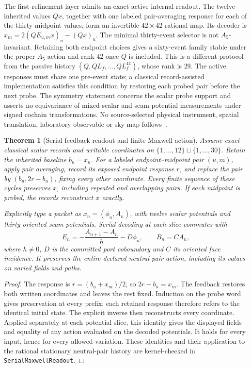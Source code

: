 \documentclass[11pt]{article}
\newtheorem{theorem}{Theorem}[section]
\begin{document}
The first refinement layer admits an exact active internal readout. The
twelve inherited values \(Qx\), together with one labeled pair-averaging
response for each of the thirty midpoint values, form an invertible
\(42\times42\) rational map. Its decoder is
\(x_m=2(Q E_{u,m}x)_u-(Qx)_u\). The minimal thirty-event selector is not
\(A_5\)-invariant. Retaining both endpoint choices gives a sixty-event family
stable under the proper \(A_5\) action and rank \(42\) once \(Q\) is
included. This is a different protocol from the passive history
\((Q,QL_f,\ldots,QL_f^{41})\), whose rank is \(29\). The active responses
must share one pre-event state; a classical record-assisted implementation
satisfies this condition by restoring each probed pair before the next probe.
The symmetry statement concerns the scalar probe support and asserts no
equivariance of mixed scalar and seam-potential measurements under signed
cochain transformations. No source-selected physical instrument, spatial
translation, laboratory observable or sky map follows~\cite{ophfpe}.

\begin{theorem}[Serial feedback readout and finite Maxwell action]
\label{thm:serial-maxwell-readout}
Assume exact classical scalar records and writable coordinates on
\(\{1,\ldots,12\}\sqcup\{1,\ldots,30\}\). Retain the inherited baseline
\(b_u=x_u\). For a labeled endpoint--midpoint pair \((u,m)\), apply pair
averaging, record its exposed endpoint response \(r\), and replace the pair
by \((b_u,2r-b_u)\), fixing every other coordinate. Every finite sequence of
these cycles preserves \(x\), including repeated and overlapping pairs.
If each midpoint is probed, the records reconstruct \(x\) exactly.

Explicitly type a packet as \(x_n=(\phi_n,A_n)\), with twelve scalar
potentials and thirty oriented seam potentials. Serial decoding at each
slice commutes with
\[
 E_n=-\frac{A_{n+1}-A_n}{h}-D\phi_n,\qquad B_n=CA_n,
\]
where \(h\ne0\), \(D\) is the committed port coboundary and \(C\) its oriented face
incidence. It preserves the entire declared neutral-pair action, including
its values on varied fields and paths.
\end{theorem}
\begin{proof}
The response is \(r=(b_u+x_m)/2\), so \(2r-b_u=x_m\). The feedback restores
both written coordinates and leaves the rest fixed. Induction on the probe
word gives preservation at every prefix; each retained response therefore
refers to the identical initial state. The explicit inverse then reconstructs
every coordinate. Applied separately at each potential slice, this identity
gives the displayed fields and equality of any action evaluated on the
decoded potentials. It holds for every input, hence for every allowed
variation. These identities and their application to the rational stationary
neutral-pair history are kernel-checked in
\texttt{SerialMaxwellReadout}.
\end{proof}
\end{document}
